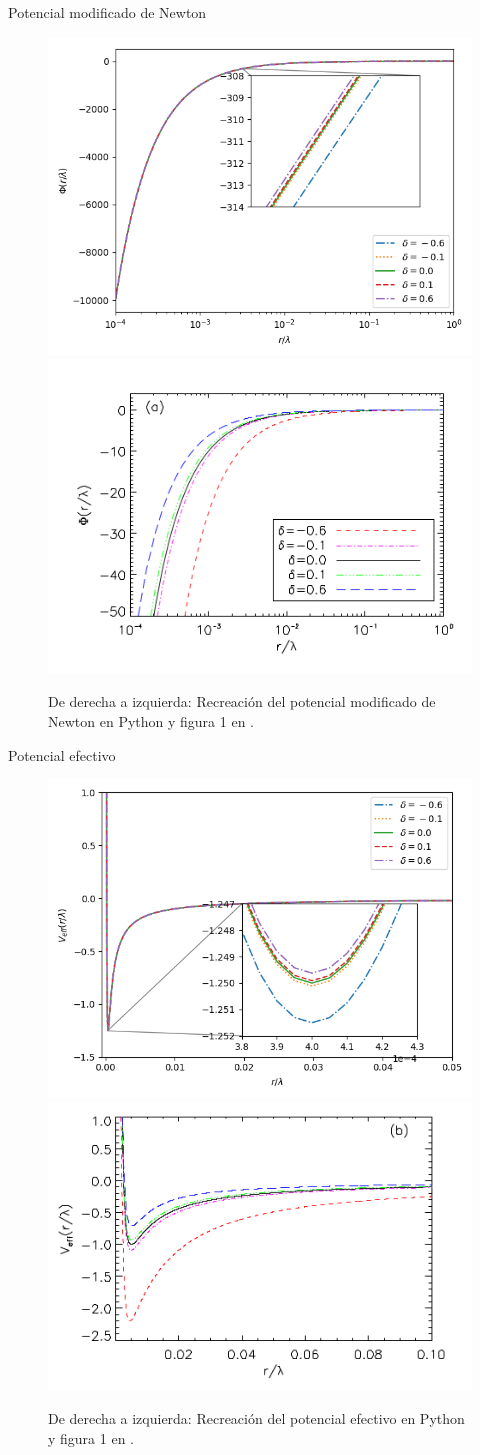 \documentclass{beamer}
\begin{document}
	\begin{frame}{Potencial modificado de Newton}
		\begin{figure}
			\includegraphics[width=.6\textwidth]{potential.png}
			\includegraphics[width=.5\textwidth]{ar1.png}
			\caption{De derecha a izquierda: Recreación del potencial modificado de Newton en Python y figura 1 en \cite{main}.}
		\end{figure}
	\end{frame}
	
	\begin{frame}{Potencial efectivo}
	\begin{figure}
			\includegraphics[width=.6\textwidth]{veff.png}
			\includegraphics[width=.5\textwidth]{ar2.png}
			\caption{De derecha a izquierda: Recreación del potencial efectivo en Python y figura 1 en \cite{main}.}
			\end{figure}
	\end{frame}
	
\end{document}
